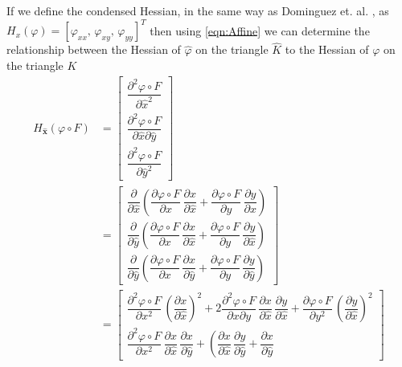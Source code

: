 If we define the condensed Hessian, in the same way as Dominguez et. al.
\cite{Dominguez08}, as $H_x(\varphi) = \left[ \varphi_{xx},\, \varphi_{xy},\,
\varphi_{yy}\right]^T$ then using \eqref{eqn:Affine} we can determine the
relationship between the Hessian of $\hat{\varphi}$ on the triangle $\hat{K}$
to the Hessian of $\varphi$ on the triangle $K$
\begin{align*}
  H_{\mathbf{\hat{x}}}(\varphi\circ F) &= \begin{bmatrix}
    \dfrac{\partial^2 \varphi\circ F}{\partial \hat{x}^2} \\[1em]
    \dfrac{\partial^2 \varphi\circ F}{\partial \hat{x} \partial\hat{y}} \\[1em]
    \dfrac{\partial^2 \varphi\circ F}{\partial \hat{y}^2}
  \end{bmatrix} \\
  &= \begin{bmatrix}
    \dfrac{\partial}{\partial \hat{x}}\left( \dfrac{\partial \varphi\circ
      F}{\partial x}\, \dfrac{\partial x}{\partial \hat{x}} + \dfrac{\partial
      \varphi\circ F}{\partial y}\, \dfrac{\partial y}{\partial
      \hat{x}} \right) \\[1em]
    \dfrac{\partial}{\partial \hat{y}}\left( \dfrac{\partial \varphi\circ
      F}{\partial x}\, \dfrac{\partial x}{\partial \hat{x}} + \dfrac{\partial
      \varphi\circ F}{\partial y}\, \dfrac{\partial y}{\partial
      \hat{x}} \right) \\[1em]
    \dfrac{\partial}{\partial \hat{y}}\left( \dfrac{\partial \varphi\circ
      F}{\partial x}\, \dfrac{\partial x}{\partial \hat{y}} + \dfrac{\partial
      \varphi\circ F}{\partial y}\, \dfrac{\partial y}{\partial
      \hat{y}} \right)
  \end{bmatrix} \\
  &= \begin{bmatrix}
    \dfrac{\partial^2 \varphi\circ F}{\partial x^2}\, \left(\dfrac{\partial
      x}{\partial \hat{x}}\right)^2 + 2 \dfrac{\partial^2 \varphi\circ F}{\partial x
      \partial y} \, \dfrac{\partial x}{\partial \hat{x}} \,
      \dfrac{\partial y}{\partial \hat{x}} + \dfrac{\partial \varphi\circ
      F}{\partial y^2}\, \left(\dfrac{\partial y}{\partial \hat{x}}\right)^2 \\[1em]
    \dfrac{\partial^2 \varphi\circ F}{\partial x^2}\, \dfrac{\partial
      x}{\partial \hat{x}}\, \dfrac{\partial x}{\partial \hat{y}} + \left(
      \dfrac{\partial x}{\partial \hat{x}}\, \dfrac{\partial y}{\partial
      \hat{y}} + \dfrac{\partial x}{\partial \hat{y}}\,

\end{bmatrix}
\end{align*}
